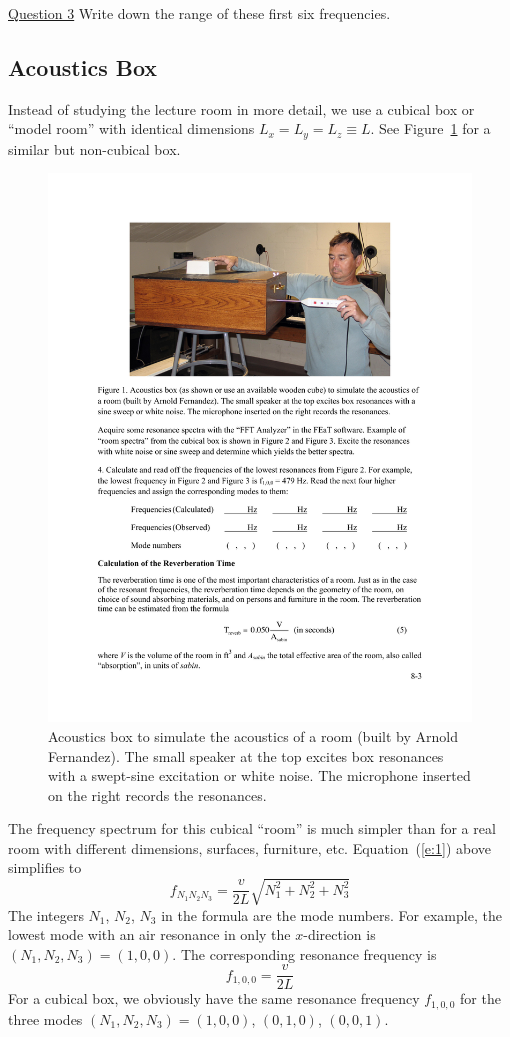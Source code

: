 \documentclass[11pt]{NSF}
\def\be{\begin{equation}}
\def\ee{\end{equation}}
\begin{document}
\underline{Question 3}  Write down the range of these first six frequencies.

\subsection{Acoustics Box}

Instead of studying the lecture room in more detail, we use a cubical
box or ``model room” with identical dimensions 
$L_x =L_y = L_z \equiv L$.
See Figure~\ref{f:1} for a similar but non-cubical box. 
%
\begin{figure}[hbtp]
\begin{center}
\includegraphics[width=.7\textwidth]{fig8_1}
\caption{Acoustics box to
simulate the acoustics of a room (built by Arnold Fernandez).  The
small speaker at the top excites box resonances with a swept-sine 
excitation or white noise. 
The microphone inserted on the right records the resonances.}
\label{f:1}
\end{center}
\end{figure}
%
The frequency spectrum for this cubical ``room” is much simpler than
for a real room with different dimensions, surfaces, furniture, etc.
Equation~(\ref{e:1}) above simplifies to
%
\be
f_{N_1N_2N_3} = \frac{v}{2L}\sqrt{N_1^2 + N_2^2 + N_3^2}
\label{e:3}
\ee
%
The integers $N_1$, $N_2$, $N_3$ in the formula are the mode numbers. 
For example, the lowest mode with an air resonance in only the 
$x$-direction is $(N_1, N_2, N_3) = (1, 0, 0)$. 
The corresponding resonance frequency is
%
\be
f_{1,0,0} = \frac{v}{2L}
\ee
%
For a cubical box, we obviously have the same resonance frequency 
$f_{1,0,0}$ for the three modes $(N_1, N_2, N_3) = (1,0,0)$, $(0,1,0)$, $(0,0,1)$.
\end{document}
